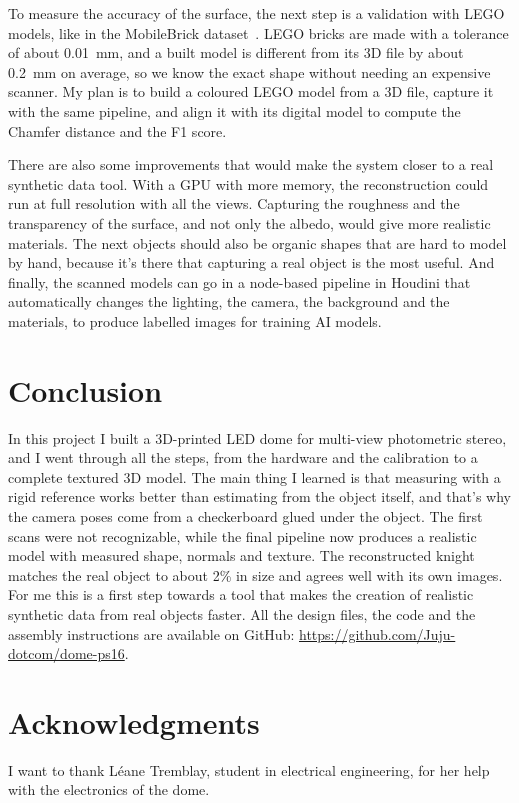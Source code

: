 \documentclass[10pt,twocolumn]{article}
\begin{document}
To measure the accuracy of the surface, the next step is a validation with LEGO models, like in the MobileBrick dataset~\cite{li2023}. LEGO bricks are made with a tolerance of about 0.01~mm, and a built model is different from its 3D file by about 0.2~mm on average, so we know the exact shape without needing an expensive scanner. My plan is to build a coloured LEGO model from a 3D file, capture it with the same pipeline, and align it with its digital model to compute the Chamfer distance and the F1 score.

There are also some improvements that would make the system closer to a real synthetic data tool. With a GPU with more memory, the reconstruction could run at full resolution with all the views. Capturing the roughness and the transparency of the surface, and not only the albedo, would give more realistic materials. The next objects should also be organic shapes that are hard to model by hand, because it's there that capturing a real object is the most useful. And finally, the scanned models can go in a node-based pipeline in Houdini that automatically changes the lighting, the camera, the background and the materials, to produce labelled images for training AI models.

\section{Conclusion}
In this project I built a 3D-printed LED dome for multi-view photometric stereo, and I went through all the steps, from the hardware and the calibration to a complete textured 3D model. The main thing I learned is that measuring with a rigid reference works better than estimating from the object itself, and that's why the camera poses come from a checkerboard glued under the object. The first scans were not recognizable, while the final pipeline now produces a realistic model with measured shape, normals and texture. The reconstructed knight matches the real object to about 2\% in size and agrees well with its own images. For me this is a first step towards a tool that makes the creation of realistic synthetic data from real objects faster. All the design files, the code and the assembly instructions are available on GitHub: \url{https://github.com/Juju-dotcom/dome-ps16}.

\section*{Acknowledgments}
I want to thank L\'eane Tremblay, student in electrical engineering, for her help with the electronics of the dome.
\end{document}
